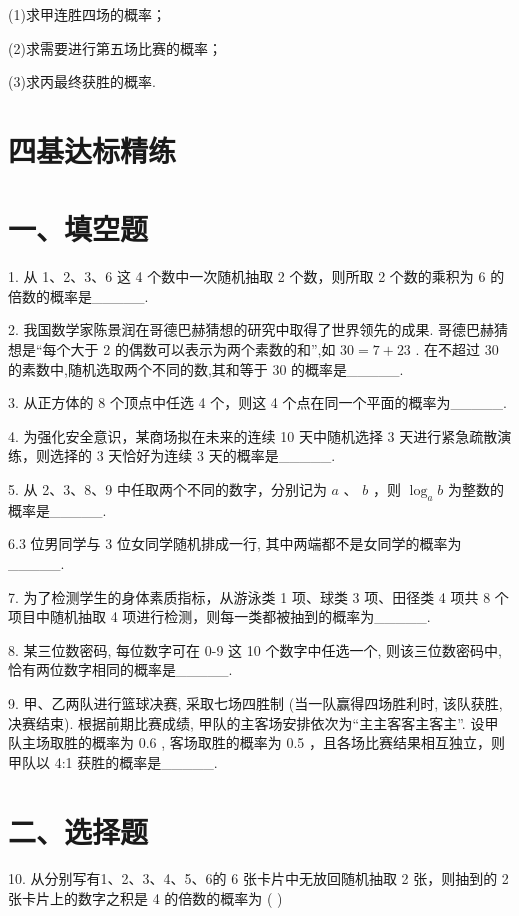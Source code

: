 (1)求甲连胜四场的概率；

(2)求需要进行第五场比赛的概率；

(3)求丙最终获胜的概率.

\section*{四基达标精练}

\section*{一、填空题}

1. 从 1、2、3、6 这 4 个数中一次随机抽取 2 个数，则所取 2 个数的乘积为 6 的倍数的概率是\_\_\_\_\_.

2. 我国数学家陈景润在哥德巴赫猜想的研究中取得了世界领先的成果. 哥德巴赫猜想是“每个大于 2 的偶数可以表示为两个素数的和”,如 ${30} = 7 + {23}$ . 在不超过 30 的素数中,随机选取两个不同的数,其和等于 30 的概率是\_\_\_\_\_.

3. 从正方体的 8 个顶点中任选 4 个，则这 4 个点在同一个平面的概率为\_\_\_\_\_.

4. 为强化安全意识，某商场拟在未来的连续 10 天中随机选择 3 天进行紧急疏散演练，则选择的 3 天恰好为连续 3 天的概率是\_\_\_\_\_.

5. 从 2、3、8、9 中任取两个不同的数字，分别记为 $a$ 、 $b$ ，则 ${\log }_{a}b$ 为整数的概率是\_\_\_\_\_.

6.3 位男同学与 3 位女同学随机排成一行, 其中两端都不是女同学的概率为\_\_\_\_\_.

7. 为了检测学生的身体素质指标，从游泳类 1 项、球类 3 项、田径类 4 项共 8 个项目中随机抽取 4 项进行检测，则每一类都被抽到的概率为\_\_\_\_\_.

8. 某三位数密码, 每位数字可在 0-9 这 10 个数字中任选一个, 则该三位数密码中, 恰有两位数字相同的概率是\_\_\_\_\_.

9. 甲、乙两队进行篮球决赛, 采取七场四胜制 (当一队赢得四场胜利时, 该队获胜, 决赛结束). 根据前期比赛成绩, 甲队的主客场安排依次为“主主客客主客主”. 设甲队主场取胜的概率为 0.6 , 客场取胜的概率为 0.5 ，且各场比赛结果相互独立，则甲队以 4:1 获胜的概率是\_\_\_\_\_.

\section*{二、选择题}

10. 从分别写有1、2、3、4、5、6的 6 张卡片中无放回随机抽取 2 张，则抽到的 2 张卡片上的数字之积是 4 的倍数的概率为 ( )

